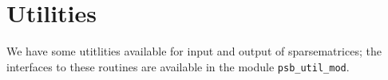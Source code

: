 \section{Utilities}
\label{sec:util}

We have some utitlities available for input and output of
sparsematrices; the interfaces to these routines are available in the
module \verb|psb_util_mod|.





